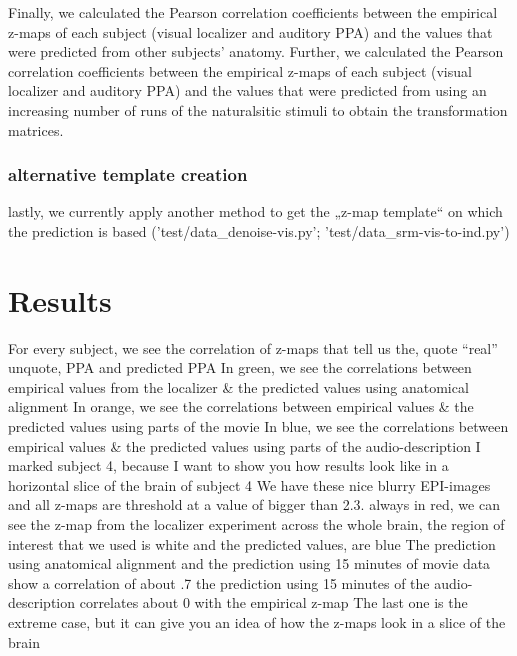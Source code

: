 
Finally, we calculated the Pearson correlation coefficients between the
empirical z-maps of each subject (visual localizer and auditory PPA) and the
values that were predicted from other subjects' anatomy.
%
Further, we calculated the Pearson correlation coefficients between the
empirical z-maps of each subject (visual localizer and auditory PPA) and the
values that were predicted from using an increasing number of runs of the
naturalsitic stimuli to obtain the transformation matrices.


\subsubsection{alternative template creation}
%
lastly, we currently apply another method to get the „z-map template“ on which
the prediction is based ('test/data\_denoise-vis.py';
'test/data\_srm-vis-to-ind.py')


\section{Results}

%
For every subject, we see the correlation of z-maps that tell us the, quote
``real'' unquote, PPA and predicted PPA
%
In green, we see the correlations between empirical values from the localizer \&
the predicted values using anatomical alignment
%
In orange, we see the correlations between empirical values \& the predicted
values using parts of the movie
%
In blue, we see the correlations between empirical values \& the predicted
values using parts of the audio-description
%
I marked subject 4, because I want to show you how results look like in a
horizontal slice of the brain of subject 4
%
We have these nice blurry EPI-images and all z-maps are threshold at a value of
bigger than 2.3.
%
always in red, we can see the z-map from the localizer experiment across the
whole brain,
%
the region of interest that we used is white and the predicted values, are blue
%
The prediction using anatomical alignment and the prediction using 15 minutes of
movie data show a correlation of about .7
%
the prediction using 15 minutes of the audio-description correlates about 0 with
the empirical z-map
%
The last one is the extreme case, but it can give you an idea of how the z-maps
look in a slice of the brain


